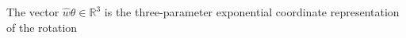 \documentclass[preview]{standalone}
\begin{document}
\begin{center}
The vector $\hat{w}\theta \in \mathbb{R}^3$ is the three-parameter exponential coordinate representation of the rotation
\end{center}
\end{document}
